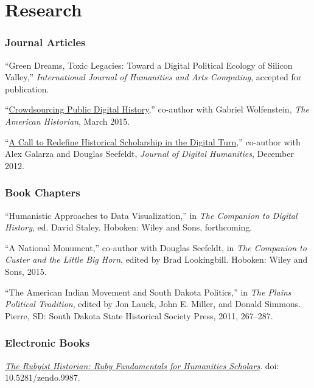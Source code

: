 \section{Research}\label{research}

\subsubsection{Journal Articles}\label{journal-articles}

``Green Dreams, Toxic Legacies: Toward a Digital Political Ecology of
Silicon Valley,'' \emph{International Journal of Humanities and Arts
Computing}, accepted for publication.

``\href{http://tah.oah.org/content/crowdsourcing-digital-public-history/}{Crowdsourcing
Public Digital History},'' co-author with Gabriel Wolfenstein, \emph{The
American Historian}, March 2015.

``\href{http://journalofdigitalhumanities.org/1-4/a-call-to-redefine-historical-scholarship-in-the-digital-turn/}{A
Call to Redefine Historical Scholarship in the Digital Turn},''
co-author with Alex Galarza and Douglas Seefeldt, \emph{Journal of
Digital Humanities}, December 2012.

\subsubsection{Book Chapters}\label{book-chapters}

``Humanistic Approaches to Data Visualization,'' in \emph{The Companion
to Digital History}, ed. David Staley. Hoboken: Wiley and Sons,
forthcoming.

``A National Monument,'' co-author with Douglas Seefeldt, in \emph{The
Companion to Custer and the Little Big Horn}, edited by Brad
Lookingbill. Hoboken: Wiley and Sons, 2015.

``The American Indian Movement and South Dakota Politics,'' in \emph{The
Plains Political Tradition}, edited by Jon Lauck, John E. Miller, and
Donald Simmons. Pierre, SD: South Dakota State Historical Society Press,
2011, 267--287.

\subsubsection{Electronic Books}\label{electronic-books}

\emph{\href{http://hepplerj.github.io/rubyist-historian/}{The Rubyist
Historian: Ruby Fundamentals for Humanities Scholars}}. doi:
10.5281/zendo.9987.

